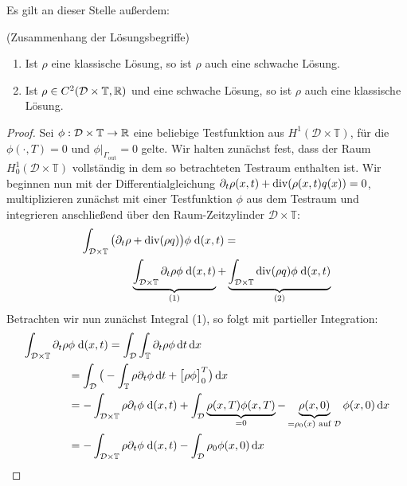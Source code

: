 Es gilt an dieser Stelle außerdem:

\begin{Lemma}(Zusammenhang der Lösungsbegriffe)
	\begin{enumerate}
		\item Ist $ \rho $ eine klassische Lösung, so ist $ \rho $ auch eine schwache Lösung.
		\item Ist $ \rho \in C^2(\mathcal{D} \times \mathbb{T} , \mathbb{R} )$ und eine schwache Lösung, so ist $ \rho $ auch eine klassische Lösung. 
	\end{enumerate}
\end{Lemma}

\begin{proof}
	Sei $ \phi : \mathcal{D} \times \mathbb{T} \to \mathbb{R} $ eine beliebige Testfunktion aus  $H^1(\mathcal{D} \times \mathbb{T}) $, für die $ \phi(\cdot,T) = 0 $ und $ \phi|_{\Gamma_{\text{out}}} = 0 $ gelte. Wir halten zunächst fest, dass der Raum $ H_0^1(\mathcal{D} \times \mathbb{T}) $ vollständig in dem so betrachteten Testraum enthalten ist.
	Wir beginnen nun mit der Differentialgleichung $ \partial_t \rho(x,t) + \operatorname{div}(\rho(x,t) q(x)) = 0  $, multiplizieren zunächst mit einer Testfunktion $ \phi $ aus dem Testraum und integrieren anschließend über den Raum-Zeitzylinder $ \mathcal{D} \times \mathbb{T} $:
	\begin{align*}
	\int_{\mathcal{D} \times \mathbb{T}} \big(\partial_t \rho &+ \operatorname{div}(\rho q ) \big) \phi \; \mathrm{d} (x,t) =  \\
	&\underbrace{\int_{\mathcal{D} \times \mathbb{T}}  \partial_t \rho \phi \; \mathrm{d} (x,t)}_{(1)} +\underbrace{\int_{\mathcal{D} \times \mathbb{T}}  
		\operatorname{div}(\rho q ) \phi \; \mathrm{d} (x,t)}_{(2)}
	\end{align*}
	Betrachten wir nun zunächst Integral (1), so folgt mit partieller Integration:
	\begin{align*}
	\int_{\mathcal{D} \times \mathbb{T}}  \partial_t \rho &\phi \; \mathrm{d} (x,t) = \int_{\mathcal{D}} \int_{\mathbb{T}} \partial_t \rho \phi \dt \dx \\&= \int_{\mathcal{D}} \big( - \int_{\mathbb{T}} \rho \partial_t \phi \dt + \big[ \rho \phi \big]_0^T  \big) \dx \\
	&= - \int_{\mathcal{D} \times \mathbb{T}} \rho \partial_t \phi \; \mathrm{d} (x,t) + \int_{\mathcal{D}} \underbrace{\rho(x,T) \phi(x,T)}_{ = 0 } - \underbrace{\rho(x,0)}_{ = \rho_0(x) \text{ auf } \mathcal{D}} \phi(x,0)  \dx\\
	&= - \int_{\mathcal{D} \times \mathbb{T}} \rho \partial_t \phi \; \mathrm{d} (x,t) - \int_{\mathcal{D}} \rho_0 \phi(x,0) \dx 

\end{align*}
\end{proof}
